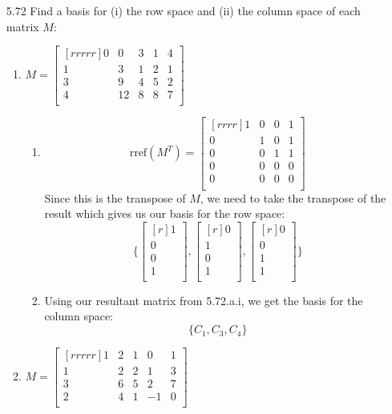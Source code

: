\documentclass[12pt]{article}
\begin{document}
\begin{enumerate}
\item[5.72] Find a basis for (i) the row space and (ii) the column space of each matrix $M$:
	\begin{enumerate}
	\item $M=\begin{bmatrix}[rrrrr]0&0&3&1&4\\1&3&1&2&1\\3&9&4&5&2\\4&12&8&8&7\\\end{bmatrix}$
		\begin{enumerate}
		\item
		\[ \mathrm{rref}(M^T) = \begin{bmatrix}[rrrr]1&0&0&1\\0&1&0&1\\0&0&1&1\\0&0&0&0\\0&0&0&0\\\end{bmatrix} \]
		Since this is the transpose of $M$, we need to take the transpose of the result which gives us our basis for the row space:
		\[ \{\begin{bmatrix}[r]1\\0\\0\\1\\\end{bmatrix},\begin{bmatrix}[r]0\\1\\0\\1\\\end{bmatrix},\begin{bmatrix}[r]0\\0\\1\\1\\\end{bmatrix}\} \]
		\item Using our resultant matrix from 5.72.a.i, we get the basis for the column space:
		\[ \{C_1,C_3,C_4\} \] 
		\end{enumerate}
	\item $M=\begin{bmatrix}[rrrrr]1&2&1&0&1\\1&2&2&1&3\\3&6&5&2&7\\2&4&1&-1&0\\\end{bmatrix}$

\end{enumerate}
\end{enumerate}
\end{document}
